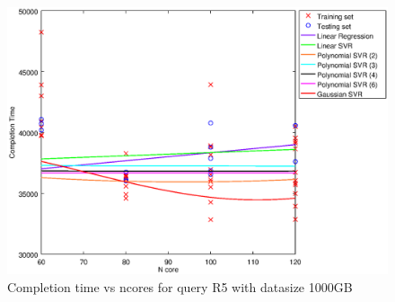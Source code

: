 
\begin {figure}[hbtp]
\centering
\includegraphics[width=\textwidth]{output/R5_1000_LINEAR_NCORE/plot_R5_1000.eps}
\caption{Completion time vs ncores for query R5 with datasize 1000GB}
\label{fig:coreonly_linear_R5_1000}
\end {figure}
